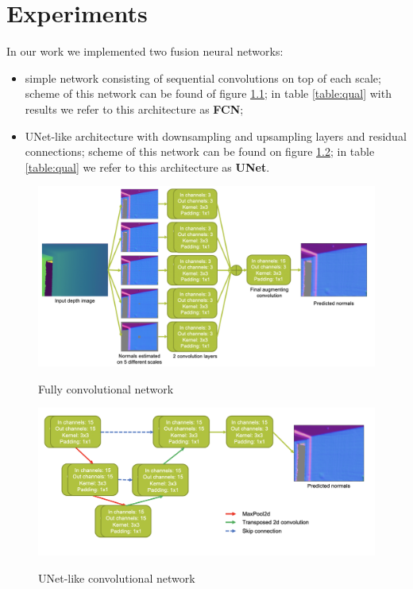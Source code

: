 \chapter{Experiments} \label{exp}

In our work we implemented two fusion neural networks:
\begin{itemize}
    \item simple network consisting of sequential convolutions on top of each scale; scheme of this network can be found of figure \ref{fig:fcn}; in table \ref{table:qual} with results we refer to this architecture as \textbf{FCN};
    \item UNet-like \cite{unet} architecture with downsampling and upsampling layers and residual connections; scheme of this network can be found on figure \ref{fig:unet}; in table \ref{table:qual} we refer to this architecture as \textbf{UNet}.
\end{itemize}

\begin{figure}
\caption{Fully convolutional network}
\centering
\includegraphics[width=\textwidth]{images/Screen Shot 2020-05-27 at 7.47.52 PM.png}
\label{fig:fcn}
\end{figure}

\begin{figure}
\caption{UNet-like convolutional network}
\centering
\includegraphics[width=\textwidth]{images/Screen Shot 2020-05-27 at 7.51.30 PM.png}
\label{fig:unet}
\end{figure}

